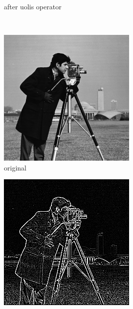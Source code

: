 \documentclass[12pt]{article}
\begin{document}
\begin{figure}[H]
\begin{subfigure}[t]{\subfiguresize}
        \caption{after uolis operator}
    \end{subfigure}
    \\
    \begin{subfigure}[t]{\subfiguresize}
        \includegraphics[width=\textwidth]{cameraman.png}
        \caption{original}
    \end{subfigure}
    \hspace{1em}
    \begin{subfigure}[t]{\subfiguresize}
        \includegraphics[width=\textwidth]{cameraman_uolis.png}

\end{subfigure}
\end{figure}
\end{document}
